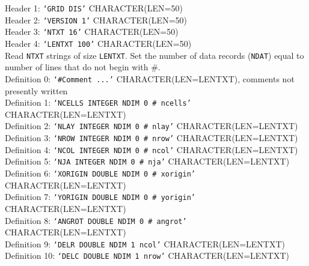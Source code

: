 \vspace{5mm}
\noindent Header 1: \texttt{`GRID DIS'}  {\color{red} \footnotesize{CHARACTER(LEN=50)}} \\
\noindent Header 2: \texttt{`VERSION 1'}  {\color{red} \footnotesize{CHARACTER(LEN=50)}} \\
\noindent Header 3: \texttt{`NTXT 16'} {\color{red} \footnotesize{CHARACTER(LEN=50)}}\\
\noindent Header 4: \texttt{`LENTXT 100'} {\color{red} \footnotesize{CHARACTER(LEN=50)}}\\

\vspace{5mm}
\noindent Read \texttt{NTXT} strings of size \texttt{LENTXT}. Set the number of data records (\texttt{NDAT}) equal to number of lines that do not begin with \#.  \\
\noindent Definition 0: \texttt{`\#Comment ...'} {\color{red} \footnotesize{CHARACTER(LEN=LENTXT)}, comments not presently written} \\
\noindent Definition 1: \texttt{`NCELLS INTEGER NDIM 0 \# ncells'} {\color{red} \footnotesize{CHARACTER(LEN=LENTXT)}} \\
\noindent Definition 2: \texttt{`NLAY INTEGER NDIM 0 \# nlay'} {\color{red} \footnotesize{CHARACTER(LEN=LENTXT)}} \\
\noindent Definition 3: \texttt{`NROW INTEGER NDIM 0 \# nrow'} {\color{red} \footnotesize{CHARACTER(LEN=LENTXT)}} \\
\noindent Definition 4: \texttt{`NCOL INTEGER NDIM 0 \# ncol'} {\color{red} \footnotesize{CHARACTER(LEN=LENTXT)}} \\
\noindent Definition 5: \texttt{`NJA INTEGER NDIM 0 \# nja'} {\color{red} \footnotesize{CHARACTER(LEN=LENTXT)}} \\
\noindent Definition 6: \texttt{`XORIGIN DOUBLE NDIM 0 \# xorigin'} {\color{red} \footnotesize{CHARACTER(LEN=LENTXT)}} \\
\noindent Definition 7: \texttt{`YORIGIN DOUBLE NDIM 0 \# yorigin'} {\color{red} \footnotesize{CHARACTER(LEN=LENTXT)}} \\
\noindent Definition 8: \texttt{`ANGROT DOUBLE NDIM 0 \# angrot'} {\color{red} \footnotesize{CHARACTER(LEN=LENTXT)}} \\
\noindent Definition 9: \texttt{`DELR DOUBLE NDIM 1 ncol'} {\color{red} \footnotesize{CHARACTER(LEN=LENTXT)}} \\
\noindent Definition 10: \texttt{`DELC DOUBLE NDIM 1 nrow'} {\color{red} \footnotesize{CHARACTER(LEN=LENTXT)}} \\
